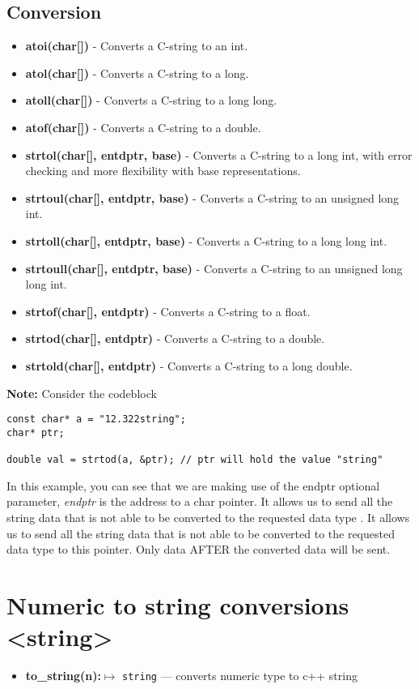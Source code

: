 \documentclass{report}
\begin{document}
    \subsection{Conversion}
    \begin{itemize}
        \item \textbf{atoi(char[])} - Converts a C-string to an int.
        \item \textbf{atol(char[])} - Converts a C-string to a long.
        \item \textbf{atoll(char[])} - Converts a C-string to a long long.
        \item \textbf{atof(char[])} - Converts a C-string to a double.
        \item \textbf{strtol(char[], entdptr, base)} - Converts a C-string to a long int, with error checking and more flexibility with base representations.
        \item \textbf{strtoul(char[], entdptr, base)} - Converts a C-string to an unsigned long int.
        \item \textbf{strtoll(char[], entdptr, base)} - Converts a C-string to a long long int.
        \item \textbf{strtoull(char[], entdptr, base)} - Converts a C-string to an unsigned long long int.
        \item \textbf{strtof(char[], entdptr)} - Converts a C-string to a float.
        \item \textbf{strtod(char[], entdptr)} - Converts a C-string to a double.
        \item \textbf{strtold(char[], entdptr)} - Converts a C-string to a long double.
    \end{itemize}
    \bigbreak \noindent 
    \textbf{Note:} Consider the codeblock
    \begin{verbatim}
const char* a = "12.322string";
char* ptr;

double val = strtod(a, &ptr); // ptr will hold the value "string"
    \end{verbatim}
    \bigbreak \noindent 
    In this example, you can see that we are making use of the endptr optional parameter, \textit{endptr} is the address to a char pointer. It allows us to send all the string data that is not able to be converted to the requested data type . It allows us to send all the string data that is not able to be converted to the requested data type to this pointer. Only data AFTER the converted data will be sent.

    
    \pagebreak \bigbreak \noindent 
    \section{\LARGE Numeric to string conversions <string>}
    \bigbreak \noindent 
    \begin{itemize}
        \item \textbf{to\_string(n):}$\mapsto$ \texttt{string} --- converts numeric type to c++ string
    \end{itemize}
\end{document}
